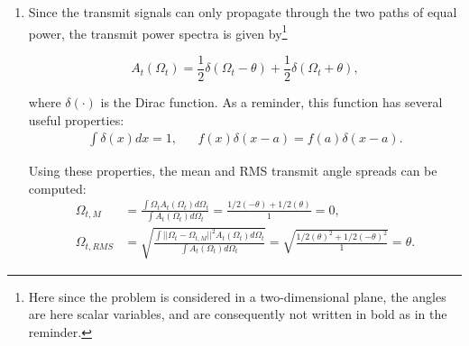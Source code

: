 \documentclass [a4paper, 11pt] {article}
\begin{document}
    \begin{solution}


      \begin{enumerate}

\item Since the transmit signals can only propagate through the two paths of equal power, the transmit power spectra is given by\footnote{Here since the problem is considered in a two-dimensional plane, the angles are here scalar variables, and are consequently not written in bold as in the reminder.}

    \begin{equation}
        A_t(\Omega_t) = \frac{1}{2} \delta(\Omega_t - \theta) + \frac{1}{2} \delta(\Omega_t + \theta),
    \end{equation}

    where $\delta (\cdot)$ is the Dirac function. As a reminder, this function has several useful properties:
    \begin{align}
        \int \delta (x) dx = 1, &&  f(x) \delta (x-a) = f(a)\delta (x-a).
    \end{align}

    Using these properties, the mean and RMS transmit angle spreads can be computed:
    \begin{align}
      \Omega_{t,M} &= \frac{\int \Omega_t A_t(\Omega_t) d\Omega_t}{\int A_t(\Omega_t) d\Omega_t}  = \frac{1/2(-\theta) + 1/2(\theta)}{1}=0, \\
      \Omega_{t,RMS} &= \sqrt{\frac{\int \big| \big| \Omega_t - \Omega_{t,M} \big| \big|^2 A_t(\Omega_t) d\Omega_t}{\int A_t(\Omega_t) d\Omega_t}} = \sqrt{\frac{1/2(\theta)^2 + 1/2 (-\theta)^2}{1}} = \theta.
    \end{align}


\end{enumerate}
\end{solution}
\end{document}
